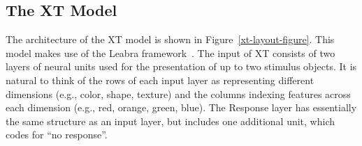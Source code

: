 \subsection{The XT Model} 


The architecture of the XT model is shown in Figure~\ref{xt-layout-figure}. This model makes use of the Leabra framework~\cite{OReillyRC:2000:Computational}. The input of XT consists of two layers of neural units used for the presentation of up to two stimulus objects. It is natural to think of the rows of each input layer as representing different dimensions (e.g., color, shape, texture) and the columns indexing features across each dimension (e.g., red, orange, green, blue). The Response layer has essentially the same structure as an input layer, but includes one additional unit, which codes for ``no response''.  

